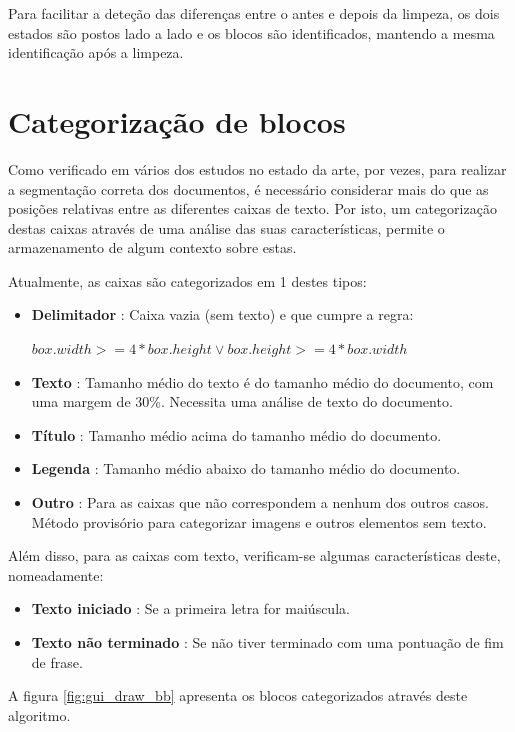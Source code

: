 Para facilitar a deteção das diferenças entre o antes e depois da limpeza, os dois estados são postos lado a lado e os blocos são identificados, mantendo a mesma identificação após a limpeza. 




\section{Categorização de blocos}
\label{categorizacao_blocos}

Como verificado em vários dos estudos no estado da arte, por vezes, para realizar a segmentação correta dos documentos, é necessário considerar mais do que as posições relativas entre as diferentes caixas de texto. Por isto, um categorização destas caixas através de uma análise das suas características, permite o armazenamento de algum contexto sobre estas.

Atualmente, as caixas são categorizados em 1 destes tipos:

\begin{itemize}
    \item \textbf{Delimitador} : Caixa vazia (sem texto) e que cumpre a regra:

        $box.width >= 4*box.height \vee box.height >= 4*box.width$
        \item \textbf{Texto} : Tamanho médio do texto é do tamanho médio do documento, com uma margem de 30\%. Necessita uma análise de texto do documento.
        \item  \textbf{Título} : Tamanho médio acima do tamanho médio do documento.
        \item \textbf{Legenda} : Tamanho médio abaixo do tamanho médio do documento.
        \item \textbf{Outro} : Para as caixas que não correspondem a nenhum dos outros casos. Método provisório para categorizar imagens e outros elementos sem texto.
\end{itemize}

    Além disso, para as caixas com texto, verificam-se algumas características deste, nomeadamente:
    \begin{itemize}
        \item \textbf{Texto iniciado} : Se a primeira letra for maiúscula.
        \item \textbf{Texto não terminado} : Se não tiver terminado com uma pontuação de fim de frase.
    \end{itemize}

A figura \ref{fig:gui_draw_bb} apresenta os blocos categorizados através deste algoritmo.


